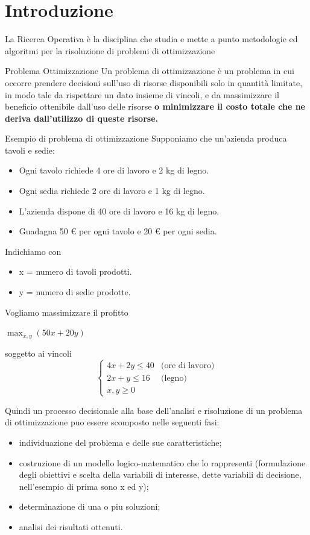 \chapter{Introduzione}
La Ricerca Operativa è la disciplina che studia e mette a punto metodologie ed algoritmi per la risoluzione di problemi di ottimizzazione
\begin{definition}{Problema Ottimizzazione}
    Un problema di ottimizzazione è un problema in cui occorre prendere decisioni sull'uso di risorse disponibili solo in quantità limitate,
    in modo tale da rispettare un dato insieme di vincoli, e da massimizzare il beneficio ottenibile dall'uso delle risorse \textbf{o minimizzare
    il costo totale che ne deriva dall'utilizzo di queste risorse.}
\end{definition}
\begin{example}{Esempio di problema di ottimizzazione}
    Supponiamo che un'azienda produca tavoli e sedie:
    \begin{itemize}
        \item Ogni tavolo richiede 4 ore di lavoro e 2 kg di legno.
        \item Ogni sedia richiede 2 ore di lavoro e 1 kg di legno.
        \item L'azienda dispone di 40 ore di lavoro e 16 kg di legno.
        \item Guadagna 50 € per ogni tavolo e 20 € per ogni sedia.
    \end{itemize}
    Indichiamo con
    \begin{itemize}
        \item x = numero di tavoli prodotti.
        \item y = numero di sedie prodotte.
    \end{itemize}
    Vogliamo massimizzare il profitto
    \begin{center}
        $\max_{x,y} (50x + 20y)$


        soggetto ai vincoli
        $$
        \begin{cases}
        4x + 2y \le 40 & \text{(ore di lavoro)} \\
        2x + y \le 16 & \text{(legno)} \\
        x, y \ge 0
        \end{cases}
        $$
    \end{center}
\end{example}
Quindi un processo decisionale alla base dell'analisi e risoluzione di un problema
di ottimizzazione puo essere scomposto nelle seguenti fasi:
\begin{itemize}
    \item individuazione del problema e delle sue caratteristiche;
    \item costruzione di un modello logico-matematico che lo rappresenti (formulazione degli obiettivi e scelta della variabili di interesse, dette variabili
di decisione, nell'esempio di prima sono x ed y);
    \item determinazione di una o piu soluzioni;
    \item analisi dei risultati ottenuti.
\end{itemize}
\newpage
